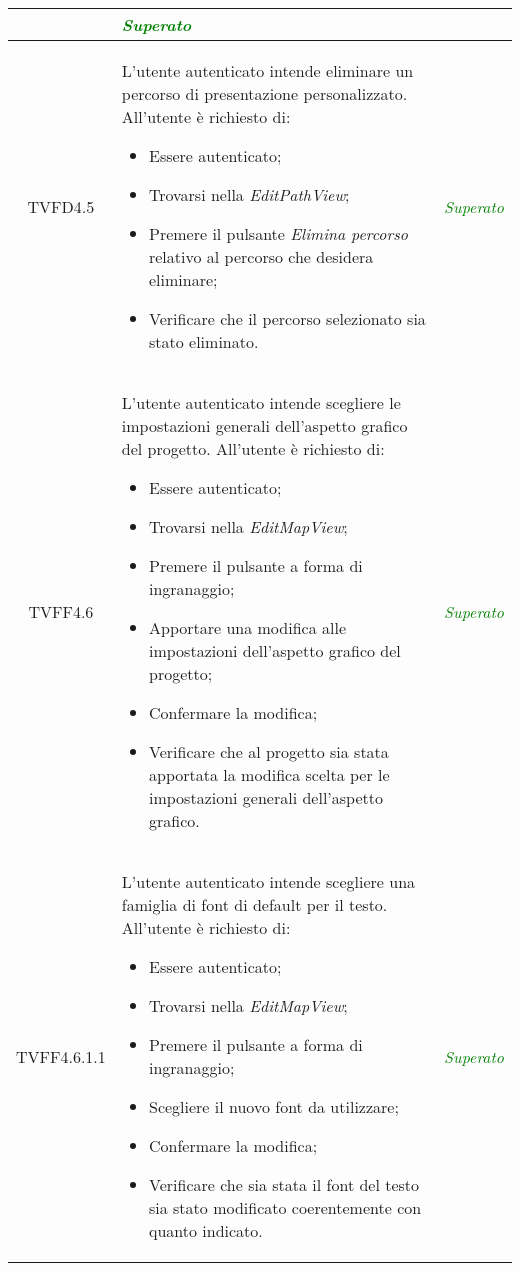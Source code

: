 \begin{longtable}{|c|>{}m{8cm}|c|}
\begin{itemize}
\end{itemize} & \textcolor{Green}{\textit{Superato}}\\ \hline
\hypertarget{TVFD4.5}{TVFD4.5} & L'utente autenticato intende eliminare un percorso di presentazione personalizzato.
All'utente è richiesto di:
\begin{itemize}
	\item Essere autenticato;
	\item Trovarsi nella \textit{EditPathView};
	\item Premere il pulsante \textit{Elimina percorso} relativo al percorso che desidera eliminare;
	\item Verificare che il percorso selezionato sia stato eliminato.
\end{itemize} & \textcolor{Green}{\textit{Superato}}\\ \hline
\hypertarget{TVFF4.6}{TVFF4.6} &  L'utente autenticato intende scegliere le impostazioni generali dell’aspetto grafico del progetto.
All'utente è richiesto di:
\begin{itemize}
	\item Essere autenticato;
	\item Trovarsi nella \textit{EditMapView};
	\item Premere il pulsante a forma di ingranaggio;
	\item Apportare una modifica alle impostazioni dell'aspetto grafico del progetto;
	\item Confermare la modifica;
	\item Verificare che al progetto sia stata apportata la modifica scelta per le impostazioni generali dell'aspetto grafico.
\end{itemize} & \textcolor{Green}{\textit{Superato}}\\ \hline
\hypertarget{TVFF4.6.1.1}{TVFF4.6.1.1} & L'utente autenticato intende scegliere una famiglia di font di default per il testo.
All'utente è richiesto di:
\begin{itemize}
	\item Essere autenticato;
	\item Trovarsi nella \textit{EditMapView};
	\item Premere il pulsante a forma di ingranaggio;
\item Scegliere il nuovo font da utilizzare;
	\item Confermare la modifica;
	\item Verificare che sia stata il font del testo sia stato modificato coerentemente con quanto indicato.
\end{itemize} & \textcolor{Green}{\textit{Superato}}\\ \hline

\end{longtable}
